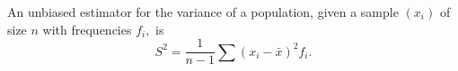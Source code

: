 An unbiased estimator for the variance of a population, given a
sample $(x_{i})$ of size $n$ with frequencies $f_i,$ is 
\[ 
S^2 = \frac{1}{n-1} \sum ( x_i - \bar{x} ) ^2 f_i . 
\]